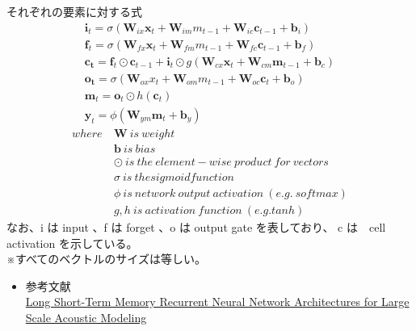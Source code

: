 \documentclass[dvipdfmx,10pt,presentation]{beamer}
\begin{document}
\begin{frame}[allowframebreaks]{それぞれの要素に対する式}
\begin{align}
\bm{i}_t=\sigma(\bm{W}_{ix}\bm{x}_t + \bm{W}_{im}m_{t-1} + \bm{W}_{ic}\bm{c}_{t-1} + \bm{b}_i) \\ 
\bm{f}_t=\sigma(\bm{W}_{fx}\bm{x}_t + \bm{W}_{fm}m_{t-1} + \bm{W}_{fc}\bm{c}_{t-1} + \bm{b}_f) \\
\bm{c_t}=\bm{f}_t \odot \bm{c}_{t-1} + \bm{i}_t \odot g(\bm{W}_{cx}\bm{x}_t + \bm{W}_{cm}\bm{m}_{t-1} + \bm{b}_c) \\
\bm{o_t}=\sigma(\bm{W}_{ox}x_t + \bm{W}_{om}m_{t-1} + \bm{W}_{oc}\bm{c}_t + \bm{b}_o) \\
\bm{m}_t = \bm{o}_t \odot h(\bm{c}_t) \\
\bm{y}_t = \phi(\bm{W}_{ym}\bm{m}_t + \bm{b}_y)
\end{align}
\begin{align}
where\ &\bm{W}\ is\ weight \\
       &\bm{b}\ is\ bias \\
       &\odot\ is\ the\ element-wise\ product\ for\ vectors\\ 
       &\sigma\ is\ the sigmoid function \\
       &\phi \ is\ network\ output\ activation\ (e.g.\ softmax) \\
       &g,h \ is\ activation\ function\ (e.g. tanh)
\end{align}
なお、i は input 、f は forget 、o は output gate を表しており、 c は　cell activation を示している。\\
※すべてのベクトルのサイズは等しい。\\
\begin{itemize}
\item 参考文献\\
\href{https://static.googleusercontent.com/media/research.google.com/ja//pubs/archive/43905.pdf}{Long Short-Term Memory Recurrent Neural Network Architectures for Large Scale Acoustic Modeling}\\
\end{itemize}
\end{frame}
\end{document}
